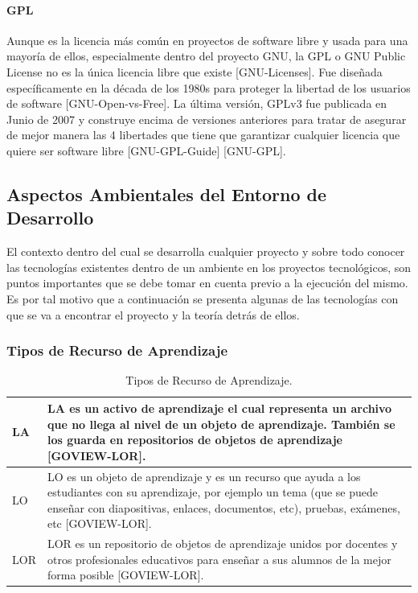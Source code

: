 \paragraph{GPL}
Aunque es la licencia más común en proyectos de software libre y usada para una mayoría de ellos, especialmente dentro del proyecto GNU, la GPL o GNU Public License no es la única licencia libre que existe [GNU-Licenses]. Fue diseñada específicamente en la década de los 1980s para proteger la libertad de los usuarios de software [GNU-Open-vs-Free]. La última versión, GPLv3 fue publicada en Junio de 2007 y construye encima de versiones anteriores para tratar de asegurar de mejor manera las 4 libertades que tiene que garantizar cualquier licencia que quiere ser software libre [GNU-GPL-Guide] [GNU-GPL].

\subsection{Aspectos Ambientales del Entorno de Desarrollo}
El contexto dentro del cual se desarrolla cualquier proyecto y sobre todo conocer las tecnologías existentes dentro de un ambiente en los proyectos tecnológicos, son puntos importantes que se debe tomar en cuenta previo a la ejecución del mismo. Es por tal motivo que a continuación se presenta algunas de las tecnologías con que se va a encontrar el proyecto y la teoría detrás de ellos.

\subsubsection{Tipos de Recurso de Aprendizaje}
\begin{table}[h!]
    \begin{tabular}{|p{}|p{}|}
        \hline
        LA & LA es un activo de aprendizaje el cual representa un archivo que no llega al nivel de un objeto de aprendizaje. También se los guarda en repositorios de objetos de aprendizaje [GOVIEW-LOR]. \\
        \hline
        LO & LO es un objeto de aprendizaje y es un recurso que ayuda a los estudiantes con su aprendizaje, por ejemplo un tema (que se puede enseñar con diapositivas, enlaces, documentos, etc), pruebas, exámenes, etc [GOVIEW-LOR]. \\
        \hline
        LOR & LOR es un repositorio de objetos de aprendizaje unidos por docentes y otros profesionales educativos para enseñar a sus alumnos de la mejor forma posible [GOVIEW-LOR]. \\
        \hline
    \end{tabular}
	\caption{Tipos de Recurso de Aprendizaje.}
    \label{tipos-recurso-aprendizaje}
\end{table}

